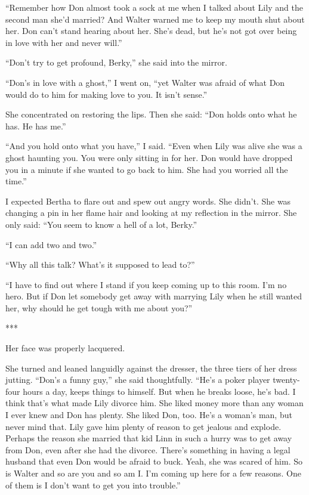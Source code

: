 \documentclass{novel}
\begin{document}
{“Remember how Don almost took a sock at me when I talked about Lily and the second man she’d married? And Walter warned me to keep my mouth shut about her. Don can’t stand hearing about her. She’s dead, but he’s not got over being in love with her and never will.”

“Don’t try to get profound, Berky,” she said into the mirror.

“Don’s in love with a ghost,” I went on, “yet Walter was afraid of what Don would do to him for making love to you. It isn’t sense.”

She concentrated on restoring the lips. Then she said: “Don holds onto what he has. He has me.”

“And you hold onto what you have,” I said. “Even when Lily was alive she was a ghost haunting you. You were only sitting in for her. Don would have dropped you in a minute if she wanted to go back to him. She had you worried all the time.”

I expected Bertha to flare out and spew out angry words. She didn’t. She was changing a pin in her flame hair and looking at my reflection in the mirror. She only said: “You seem to know a hell of a lot, Berky.”

“I can add two and two.”

“Why all this talk? What’s it supposed to lead to?”

“I have to find out where I stand if you keep coming up to this room. I’m no hero. But if Don let somebody get away with marrying Lily when he still wanted her, why should he get tough with me about you?”

***

Her face was properly lacquered.

She turned and leaned languidly against the dresser, the three tiers of her dress jutting. “Don’s a funny guy,” she said thoughtfully. “He’s a poker player twenty-four hours a day, keeps things to himself. But when he breaks loose, he’s bad. I think that’s what made Lily divorce him. She liked money more than any woman I ever knew and Don has plenty. She liked Don, too. He’s a woman’s man, but never mind that. Lily gave him plenty of reason to get jealous and explode. Perhaps the reason she married that kid Linn in such a hurry was to get away from Don, even after she had the divorce. There’s something in having a legal husband that even Don would be afraid to buck. Yeah, she was scared of him. So is Walter and so are you and so am I. I’m coming up here for a few reasons. One of them is I don’t want to get you into trouble.”

}
\end{document}
